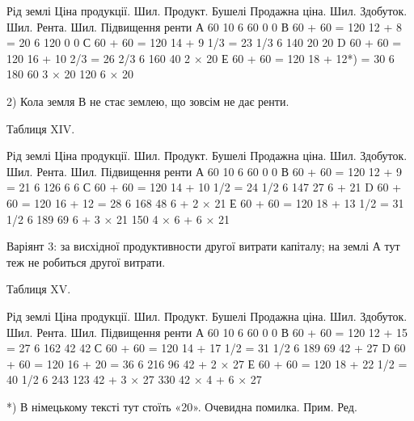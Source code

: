 Рід землі
Ціна продукції. Шил.
Продукт. Бушелі
Продажна ціна. Шил.
Здобуток. Шил.
Рента. Шил.
Підвищення ренти
А 60 10 6 60 0 0
В 60 + 60 = 120 12 + 8 = 20 6 120 0 0
С    60 + 60 = 120    14 + 9 1/3 = 23 1/3         6    140    20    20
D    60 + 60 = 120    16 + 10 2/3 = 26 2/3    6    160    40    2 × 20
Е 60 + 60 = 120 18 + 12*) = 30 6 180 60 3 × 20
120 6 × 20

2) Кола земля В не стає землею, що зовсім не дає ренти.

Таблиця XIV.

Рід землі
Ціна продукції. Шил.
Продукт. Бушелі
Продажна ціна. Шил.
Здобуток. Шил.
Рента. Шил.
Підвищення ренти
А 60 10 6 60 0 0
В 60 + 60 = 120 12 + 9 = 21 6 126 6 6
С    60 + 60 = 120    14 + 10 1/2 = 24 1/2    6    147     27    6 + 21
D 60 + 60 = 120 16 + 12 = 28 6 168 48 6 + 2 × 21
Е    60 + 60 = 120    18 + 13 1/2 = 31 1/2    6    189     69    6 + 3 × 21
 150  4 × 6 + 6 × 21

Варіянт 3: за висхідної продуктивности другої витрати капіталу; на землі
А тут теж не робиться другої витрати.

Таблиця XV.

Рід землі
Ціна продукції. Шил.
Продукт. Бушелі
Продажна ціна. Шил.
Здобуток. Шил.
Рента. Шил.
Підвищення ренти
А 60 10 6 60 0 0
В 60 + 60 = 120 12 + 15 = 27 6 162 42 42
С    60 + 60 = 120     14 + 17 1/2 = 31 1/2    6    189     69     42 + 27
D 60 + 60 = 120 16 + 20 = 36 6 216 96 42 + 2 × 27
Е    60 + 60 = 120     18 + 22 1/2 = 40 1/2    6    243     123     42 + 3 × 27
330 42 × 4 + 6 × 27

*) В німецькому тексті тут стоїть «20». Очевидна помилка. Прим. Ред.
